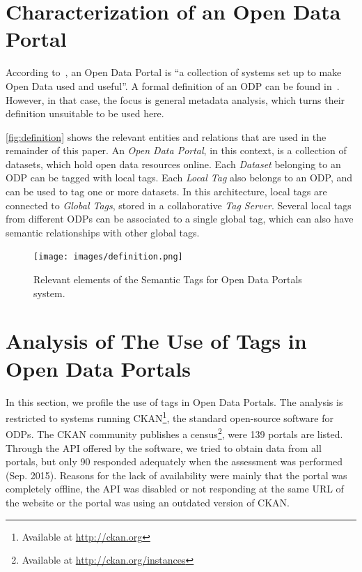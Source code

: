 \documentclass[conference]{IEEEtran}
\begin{document}
\section{Characterization of an Open Data Portal}
\label{sec:characterization} 

According to~\cite{Colpaert2013}, an Open Data Portal is ``a collection of systems set up to make Open Data used and useful''.
A formal definition of an ODP can be found in~\cite{Umbrich2015}.
However, in that case, the focus is general metadata analysis, which turns their definition unsuitable to be used here. 

\autoref{fig:definition} shows the relevant entities and relations that are used in the remainder of this paper.
An \emph{Open Data Portal}, in this context, is a collection of datasets, which hold open data resources online.
Each \emph{Dataset} belonging to an ODP can be tagged with local tags. 
Each \emph{Local Tag} also belongs to an ODP, and can be used to tag one or more datasets.
In this architecture, local tags are connected to \emph{Global Tags}, stored in a collaborative \emph{Tag Server}.
Several local tags from different ODPs can be associated to a single global tag, which can also have semantic relationships with other global tags.

\begin{figure}
\begin{center}
\texttt{[image: images/definition.png]}
\caption{Relevant elements of the Semantic Tags for Open Data Portals system.}
\label{fig:definition}
\end{center}
\end{figure}

\section{Analysis of The Use of Tags in Open Data Portals}
\label{sec:analysis} 

In this section, we profile the use of tags in Open Data Portals. 
The analysis is restricted to systems running CKAN\footnote{Available at \url{http://ckan.org}}, the standard open-source software for ODPs. 
The CKAN community publishes a census\footnote{Available at \url{http://ckan.org/instances}}, were 139 portals are listed. 
Through the API offered by the software, we tried to obtain data from all portals, but only 90 responded adequately when the assessment was performed (Sep. 2015).
Reasons for the lack of availability were mainly that the portal was completely offline, the API was disabled or not responding at the same URL of the website or the portal was using an outdated version of CKAN. 
\end{document}
